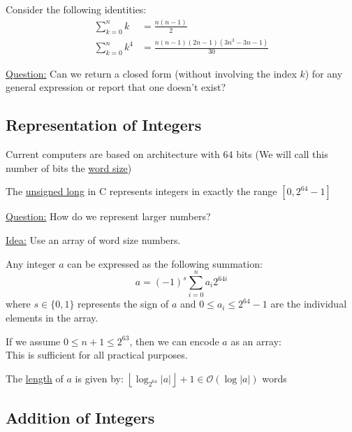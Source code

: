 \begin{example}
    Consider the following identities:
    \begin{align}
        \sum_{k = 0}^n k &= \frac{n(n-1)}{2} \\
        \sum_{k = 0}^n k^4 &= \frac{n(n-1)(2n - 1)(3n^3 - 3n - 1)}{30}
    \end{align}

    \underline{Question:} Can we return a closed form (without involving the index $k$) for any general expression or report that one doesn't exist? 
\end{example}


\subsection{Representation of Integers}
Current computers are based on architecture with $64$ bits (We will call this number of bits the \underline{word size})

\begin{example}
    The \underline{unsigned long} in C represents integers in exactly the range $[0, 2^{64} - 1]$
\end{example}

\underline{Question:} How do we represent larger numbers?

\underline{Idea:} Use an array of word size numbers.

Any integer $a$ can be expressed as the following summation:
\begin{equation}
    a = (-1)^s \sum_{i = 0}^n a_i 2^{64i}
\end{equation}
where $s \in \{0,1\}$ represents the sign of $a$ and $0 \leq a_i \leq 2^{64} - 1$ are the individual elements in the array.

If we assume $0 \leq n + 1 \leq 2^{63}$, then we can encode $a$ as an array:
\begin{equation}
    [s \cdot 2^{63} + n + 1, a_0, a_1, \ldots, a_n]
\end{equation}
This is sufficient for all practical purposes.

\begin{note}
    The \underline{length} of $a$ is given by: $\left\lfloor\log_{2^{64}} |a|\right\rfloor + 1 \in \mathcal{O}\left(\log |a|\right)$ words
\end{note}

\subsection{Addition of Integers}

